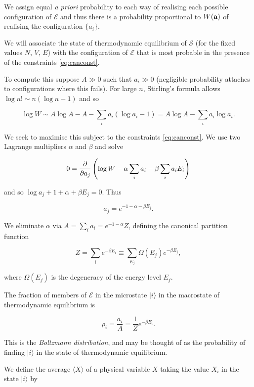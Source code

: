 \documentclass{notes}
\newcommand{\cS}{\mathcal{S}}
\newcommand{\cE}{\mathcal{E}}
\newcommand{\ket}[1]{|#1\rangle}
\newcommand{\ave}[1]{\langle#1\rangle}
\begin{document}
We assign equal \emph{a priori} probability to each way of
realising each possible configuration of $\cE$ and thus
there is a probability proportional to $W(\mathbf{a})$ of realising
the configuration $\{a_i\}$.

We will associate the state of thermodynamic equilibrium of $\cS$
(for the fixed values $N$, $V$, $E$) with the configuration of
$\cE$ that is most probable in the presence of the constraints
\eqref{eq:canconst}.

To compute this suppose $A \gg 0$ such that $a_i \gg 0$
(negligible probability attaches to configurations where this fails).
For large $n$, Stirling's formula allows $\log n! \sim n \left( \log n - 1
\right)$ and so

\[
\log W \sim A \log A - A - \sum_i a_i \left( \log a_i - 1 \right)
= A \log A - \sum_i a_i \log a_i.
\]

We seek to maximise this subject to the constraints \eqref{eq:canconst}.
We use two Lagrange multipliers $\alpha$ and $\beta$ and solve

\[
0 = \frac{\partial }{\partial a_j} \left( \log W - \alpha \sum_i a_i - \beta \sum_i
a_i E_i \right)
\]

and so $\log a_j + 1 + \alpha + \beta E_j = 0$.  Thus

\begin{equation}\label{eq:ajs}
a_j = e^{-1 - \alpha - \beta E_j}.
\end{equation}

We eliminate $\alpha$ via $A = \sum_i a_i = e^{-1 - \alpha} Z$,
defining the canonical partition function

\begin{equation}\label{eq:canpar}
Z = \sum_i e^{- \beta E_i} \equiv
\sum_{E_j} \Omega(E_j) e^{-\beta E_j},
\end{equation}

where $\Omega(E_j)$ is the degeneracy of the energy level $E_j$.

The fraction of members of $\cE$ in the microstate $\ket{i}$
in the macrostate of thermodynamic equilibrium is

\begin{equation}\label{eq:boltzman}
\rho_i = \frac{a_i}{A} = \frac{1}{Z} e^{- \beta E_i}.
\end{equation}

This is the \emph{Boltzmann distribution}, and may be thought of
as the probability of finding $\ket{i}$ in the state of thermodynamic
equilibrium.

We define the average $\ave{X}$ of a physical variable $X$ taking the
value $X_i$ in the state $\ket{i}$ by
\end{document}
